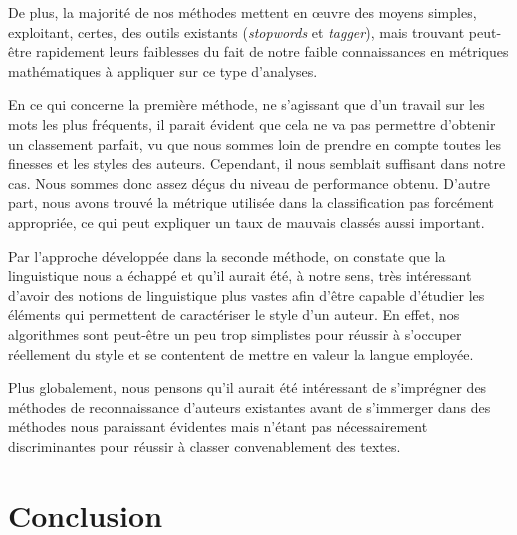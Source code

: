 \documentclass[a4paper,12pt]{report}
\begin{document}
De plus, la majorité de nos méthodes mettent en œuvre des moyens simples, exploitant, certes, des outils existants (\textit{stopwords} et \textit{tagger}), mais trouvant peut-être rapidement leurs faiblesses du fait de notre faible connaissances en métriques mathématiques à appliquer sur ce type d'analyses.

En ce qui concerne la première méthode, ne s'agissant que d'un travail sur les mots les plus fréquents, il parait évident que cela ne va pas permettre d'obtenir un classement parfait, vu que nous sommes loin de prendre en compte toutes les finesses et les styles des auteurs. Cependant, il nous semblait suffisant dans notre cas. Nous sommes donc assez déçus du niveau de performance obtenu. D'autre part, nous avons trouvé la métrique utilisée dans la classification pas forcément appropriée, ce qui peut expliquer un taux de mauvais classés aussi important.

Par l'approche développée dans la seconde méthode, on constate que la linguistique nous a échappé et qu'il aurait été, à notre sens, très intéressant d'avoir des notions de linguistique plus vastes afin d'être capable d'étudier les éléments qui permettent de caractériser le style d'un auteur. En effet, nos algorithmes sont peut-être un peu trop simplistes pour réussir à s'occuper réellement du style et se contentent de mettre en valeur la langue employée.

Plus globalement, nous pensons qu'il aurait été intéressant de s'imprégner des méthodes de reconnaissance d'auteurs existantes avant de s'immerger dans des méthodes nous paraissant évidentes mais n'étant pas nécessairement discriminantes pour réussir à classer convenablement des textes.




\section*{Conclusion}
\end{document}
